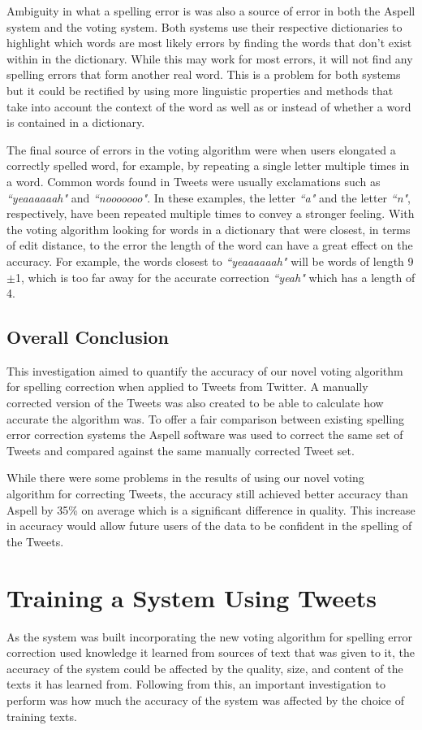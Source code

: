 Ambiguity in what a spelling error is was also a source of error in both the Aspell system and the voting system. Both systems use their respective dictionaries to highlight which words are most likely errors by finding the words that don't exist within in the dictionary. While this may work for most errors, it will not find any spelling errors that form another real word. This is a problem for both systems but it could be rectified by using more linguistic properties and methods that take into account the context of the word as well as or instead of whether a word is contained in a dictionary.

The final source of errors in the voting algorithm were when users elongated a correctly spelled word, for example, by repeating a single letter multiple times in a word. Common words found in Tweets were usually exclamations such as \emph{``yeaaaaaah"} and \emph{``nooooooo"}. In these examples, the letter \emph{``a"} and the letter \emph{``n"}, respectively, have been repeated multiple times to convey a stronger feeling. With the voting algorithm looking for words in a dictionary that were closest, in terms of edit distance, to the error the length of the word can have a great effect on the accuracy. For example, the words closest to \emph{``yeaaaaaah"} will be words of length 9$\pm$1, which is too far away for the accurate correction \emph{``yeah"} which has a length of 4.

\subsection{Overall Conclusion}
This investigation aimed to quantify the accuracy of our novel voting algorithm for spelling correction when applied to Tweets from Twitter. A manually corrected version of the Tweets was also created to be able to calculate how accurate the algorithm was. To offer a fair comparison between existing spelling error correction systems the Aspell software was used to correct the same set of Tweets and compared against the same manually corrected Tweet set. 

While there were some problems in the results of using our novel voting algorithm for correcting Tweets, the accuracy still achieved better accuracy than Aspell by 35\% on average which is a significant difference in quality. This increase in accuracy would allow future users of the data to be confident in the spelling of the Tweets.

\section{Training a System Using Tweets}
As the system was built incorporating the new voting algorithm for spelling error correction used knowledge it learned from sources of text that was given to it, the accuracy of the system could be affected by the quality, size, and content of the texts it has learned from. Following from this, an important investigation to perform was how much the accuracy of the system was affected by the choice of training texts.

